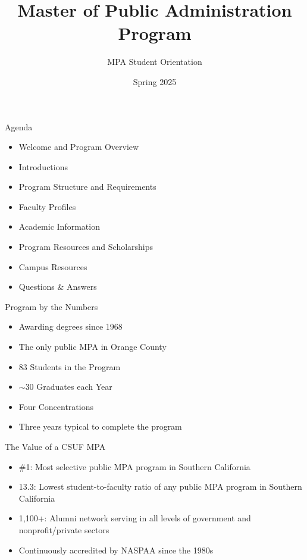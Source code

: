 \documentclass[10pt]{beamer}
\begin{document}
\title{Master of Public Administration Program}
\subtitle{MPA Student Orientation}
\date{Spring 2025}

\maketitle


\begin{frame}{Agenda}
\begin{itemize}
\item Welcome and Program Overview
\item Introductions
\item Program Structure and Requirements
\item Faculty Profiles
\item Academic Information
\item Program Resources and Scholarships
\item Campus Resources
\item Questions \& Answers
\end{itemize}
\end{frame}

\begin{frame}{Program by the Numbers}
\begin{itemize}
\item Awarding degrees since 1968
\item The only public MPA in Orange County
\item 83 Students in the Program
\item $\sim$30 Graduates each Year
\item Four Concentrations
\item Three years typical to complete the program
\end{itemize}
\end{frame}

\begin{frame}{The Value of a CSUF MPA}
\begin{itemize}
\item \#1: Most selective public MPA program in Southern California
\item 13.3: Lowest student-to-faculty ratio of any public MPA program in Southern California
\item 1,100+: Alumni network serving in all levels of government and nonprofit/private sectors
\item Continuously accredited by NASPAA since the 1980s
\end{itemize}
\end{frame}
\end{document}
